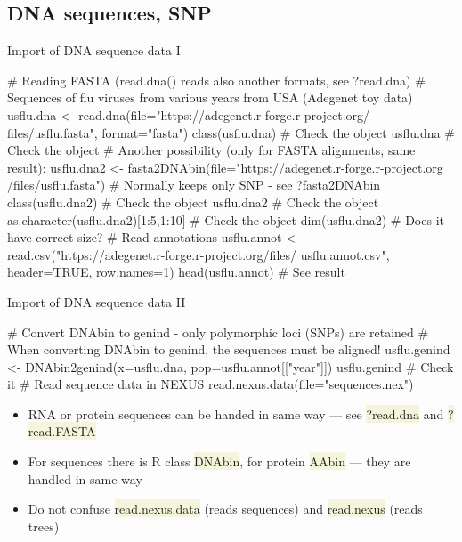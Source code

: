 \documentclass[compress, ucs, xelatex, 11pt, xcolor=svgnames, aspectratio=169,
	hyperref={
		bookmarks=true,
		unicode=true,
		colorlinks=true,
		pdftitle={Molecular data in R},
		plainpages=false,
		pdfauthor={Vojtech Zeisek},
		pdfsubject={Course about phylogeny and evolution in R},
		pdfcreator={XeLaTeX},
		pdfkeywords={R, evolution, phylogeny, molecular data},
		linkcolor=Crimson, %
		anchorcolor=Magenta, %
		citecolor=Magenta, %
		filecolor=Magenta, %
		menucolor=Magenta, %
		urlcolor=DodgerBlue, %
		pdftex},
	url={hyphens, lowtilde} %
	]{beamer}
\renewcommand{\texttt}[1]{\colorbox{Beige}{{\ttfamily #1}}}
\begin{document}
\subsection{DNA sequences, SNP}

\begin{frame}[fragile]{Import of DNA sequence data I}
	\begin{spluscode}
    # Reading FASTA (read.dna() reads also another formats, see ?read.dna)
    # Sequences of flu viruses from various years from USA (Adegenet toy data)
    usflu.dna <- read.dna(file="https://adegenet.r-forge.r-project.org/
      files/usflu.fasta", format="fasta")
    class(usflu.dna) # Check the object
    usflu.dna # Check the object
    # Another possibility (only for FASTA alignments, same result):
    usflu.dna2 <- fasta2DNAbin(file="https://adegenet.r-forge.r-project.org
      /files/usflu.fasta") # Normally keeps only SNP - see ?fasta2DNAbin
    class(usflu.dna2) # Check the object
    usflu.dna2 # Check the object
    as.character(usflu.dna2)[1:5,1:10] # Check the object
    dim(usflu.dna2) # Does it have correct size?
    # Read annotations
    usflu.annot <- read.csv("https://adegenet.r-forge.r-project.org/files/
      usflu.annot.csv", header=TRUE, row.names=1)
    head(usflu.annot) # See result
	\end{spluscode}
\end{frame}

\begin{frame}[fragile]{Import of DNA sequence data II}
	\begin{spluscode}
    # Convert DNAbin to genind - only polymorphic loci (SNPs) are retained
    # When converting DNAbin to genind, the sequences must be aligned!
    usflu.genind <- DNAbin2genind(x=usflu.dna, pop=usflu.annot[["year"]])
    usflu.genind # Check it
    # Read sequence data in NEXUS
    read.nexus.data(file="sequences.nex")
	\end{spluscode}
	\begin{itemize}
		\item RNA or protein sequences can be handed in same way --- see \texttt{?read.dna} and \texttt{?read.FASTA}
		\item For sequences there is R class \texttt{DNAbin}, for protein \texttt{AAbin} --- they are handled in same way
		\item Do not confuse \texttt{read.nexus.data} (reads sequences) and \texttt{read.nexus} (reads trees)
	\end{itemize}
\end{frame}
\end{document}
